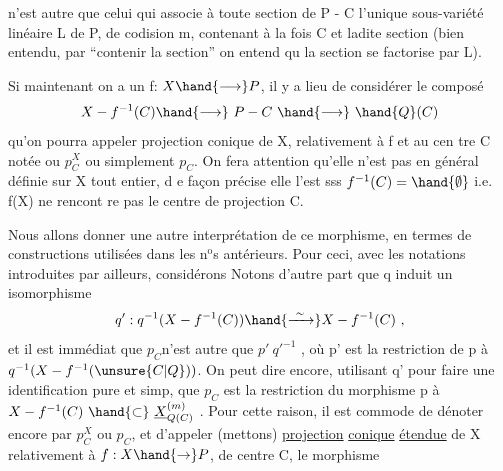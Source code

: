 
n'est autre que celui qui associe à toute section de  P - C  l'unique
sous-variété linéaire  L de P, de codision m, contenant à la fois C
et ladite section  (bien entendu, par ``contenir la section'' on entend qu
la section se factorise par L).

Si maintenant on a un f: $X \hand{\longrightarrow} P$,  il y a lieu de considérer le
composé
\[ X - f^{-1}(C) \hand{\longrightarrow}\ P - C \ \hand{\longrightarrow}\ \hand{Q}(C) \]
qu'on pourra appeler projection conique de X, relativement à f et au cen%
tre C\hand{,} notée  ou $p^{X}_{C}$ ou simplement $p_{C}$. On fera attention qu'elle n'est pas en général définie sur X tout
entier, d e façon précise elle l'est sss $f^{-1}(C)=\hand{\emptyset}$ i.e. f(X) ne rencont re
pas le centre de projection C. \hand{\unsure{/|)}}

Nous allons donner une autre interprétation de ce morphisme, en
termes de constructions utilisées dans les n$^{\text{o}}$s antérieurs.  Pour ceci,
avec les notations introduites par ailleurs, considérons
Notons d'autre part que  q  induit un  isomorphisme
\[ q':q^{-1}(X-f^{-1}(C)) \hand{\xrightarrow{\ \sim\ }} X - f^{-1}(C) \ , \]
et il est immédiat que  $p_{C}$n'est autre  que   $p'\ q'^{-1}$ , où p' est la
restriction de  p à  $q^{-1}(X-f^{-1}(\unsure{C|Q}))$.  On peut dire encore, utilisant q'
pour faire une identification pure et simp, que  $p_{C}$ est la restriction
du morphisme p  à  $X - f^{-1}(C) \ \hand{\subset}\ \underline{X}^{(m)}_{Q(C)}$ . Pour cette raison, il est
commode de dénoter encore par  $p^{X}_{C}$ ou $p_{C}$, et d'appeler  (mettons)  \uline{projection}
\uline{conique}  \uline{étendue}  de X\hand{,} relativement à $f:X\hand{\rightarrow} P$, de centre C, le morphisme

